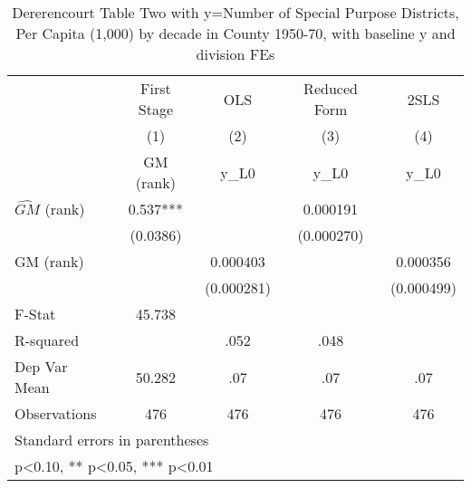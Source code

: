 \begin{table}[htbp]\centering
\def\sym#1{\ifmmode^{#1}\else\(^{#1}\)\fi}
\caption{Dererencourt Table Two with y=Number of Special Purpose Districts, Per Capita (1,000) by decade in County 1950-70, with baseline y and division FEs}
\begin{tabular}{l*{4}{c}}
\toprule
                    & First Stage   &         OLS   &Reduced Form   &        2SLS   \\
                    &\multicolumn{1}{c}{(1)}&\multicolumn{1}{c}{(2)}&\multicolumn{1}{c}{(3)}&\multicolumn{1}{c}{(4)}\\
                    &\multicolumn{1}{c}{GM  (rank)}&\multicolumn{1}{c}{y\_L0}&\multicolumn{1}{c}{y\_L0}&\multicolumn{1}{c}{y\_L0}\\
\midrule
$\hat{GM}$ (rank)   &       0.537***&               &    0.000191   &               \\
                    &    (0.0386)   &               &  (0.000270)   &               \\
\addlinespace
GM  (rank)          &               &    0.000403   &               &    0.000356   \\
                    &               &  (0.000281)   &               &  (0.000499)   \\
\midrule
F-Stat              &      45.738   &               &               &               \\
R-squared           &               &        .052   &        .048   &               \\
Dep Var Mean        &      50.282   &         .07   &         .07   &         .07   \\
Observations        &         476   &         476   &         476   &         476   \\
\bottomrule
\multicolumn{5}{l}{\footnotesize Standard errors in parentheses}\\
\multicolumn{5}{l}{\footnotesize * p<0.10, ** p<0.05, *** p<0.01}\\
\end{tabular}
\end{table}
